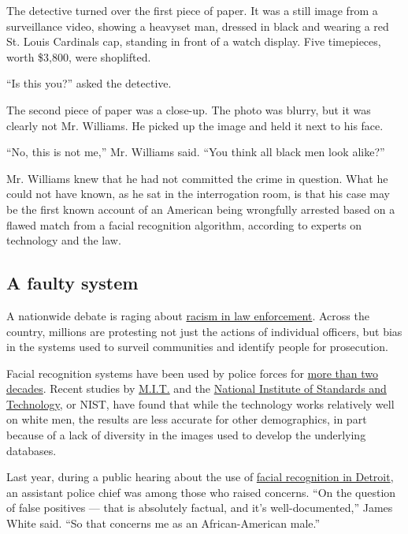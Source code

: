 The detective turned over the first piece of paper. It was a still image
from a surveillance video, showing a heavyset man, dressed in black and
wearing a red St. Louis Cardinals cap, standing in front of a watch
display. Five timepieces, worth \$3,800, were shoplifted.

``Is this you?'' asked the detective.

The second piece of paper was a close-up. The photo was blurry, but it
was clearly not Mr. Williams. He picked up the image and held it next to
his face.

``No, this is not me,'' Mr. Williams said. ``You think all black men
look alike?''

Mr. Williams knew that he had not committed the crime in question. What
he could not have known, as he sat in the interrogation room, is that
his case may be the first known account of an American being wrongfully
arrested based on a flawed match from a facial recognition algorithm,
according to experts on technology and the law.

\hypertarget{a-faulty-system}{%
\subsection{A faulty system}\label{a-faulty-system}}

A nationwide debate is raging about
\href{https://www.nytimes3xbfgragh.onion/news-event/george-floyd-protests-minneapolis-new-york-los-angeles}{racism
in law enforcement}. Across the country, millions are protesting not
just the actions of individual officers, but bias in the systems used to
surveil communities and identify people for prosecution.

Facial recognition systems have been used by police forces for
\href{https://www.nytimes3xbfgragh.onion/2020/01/12/technology/facial-recognition-police.html}{more
than two decades}. Recent studies by
\href{https://www.nytimes3xbfgragh.onion/2018/02/09/technology/facial-recognition-race-artificial-intelligence.html}{M.I.T.}
and the
\href{https://www.nytimes3xbfgragh.onion/2019/12/19/technology/facial-recognition-bias.html}{National
Institute of Standards and Technology}, or NIST, have found that while
the technology works relatively well on white men, the results are less
accurate for other demographics, in part because of a lack of diversity
in the images used to develop the underlying databases.

Last year, during a public hearing about the use of
\href{https://www.nytimes3xbfgragh.onion/2019/07/08/us/detroit-facial-recognition-cameras.html}{facial
recognition in Detroit}, an assistant police chief was among those who
raised concerns. ``On the question of false positives --- that is
absolutely factual, and it's well-documented,'' James White said. ``So
that concerns me as an African-American male.''

